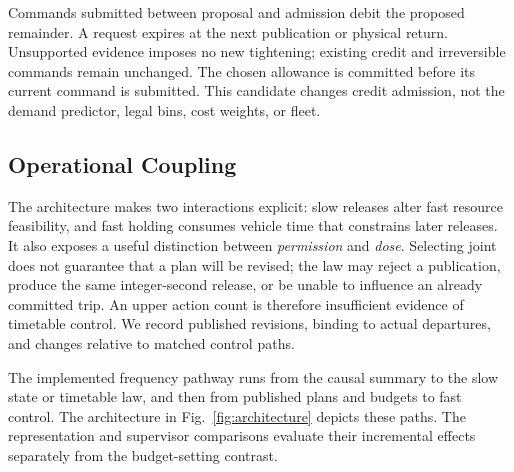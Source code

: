 Commands submitted between proposal and admission debit the proposed remainder. A request expires at the next publication or physical return. Unsupported evidence imposes no new tightening; existing credit and irreversible commands remain unchanged. The chosen allowance is committed before its current command is submitted. This candidate changes credit admission, not the demand predictor, legal bins, cost weights, or fleet.

\subsection{Operational Coupling}
The architecture makes two interactions explicit: slow releases alter fast resource feasibility, and fast holding consumes vehicle time that constrains later releases. It also exposes a useful distinction between \emph{permission} and \emph{dose}. Selecting joint does not guarantee that a plan will be revised; the law may reject a publication, produce the same integer-second release, or be unable to influence an already committed trip. An upper action count is therefore insufficient evidence of timetable control. We record published revisions, binding to actual departures, and changes relative to matched control paths.

The implemented frequency pathway runs from the causal summary to the slow state or timetable law, and then from published plans and budgets to fast control. The architecture in Fig.~\ref{fig:architecture} depicts these paths. The representation and supervisor comparisons evaluate their incremental effects separately from the budget-setting contrast.
